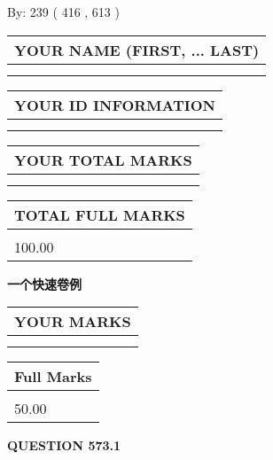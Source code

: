 \documentclass{ctexart}
\begin{document}
   
\hspace{1.0in} By: 
 239 ( 416 ,  613 )
   
   
   
   
\newpage 
\setcounter{page}{ 
   573001 } 
   
   
   
   
\noindent\begin{tabular}{|l|}
\hline
YOUR NAME (FIRST, ... LAST)  \\
\hline
 \\ 
 \\ 
\hline
\end{tabular}
\hspace{0.05in} \begin{tabular}{|l|}
\hline
 YOUR   ID   INFORMATION  \\
\hline
 \\ 
 \\ 
\hline
\end{tabular}
   
   
\vspace{0.2in}\noindent\begin{tabular}{|l|}
\hline
YOUR TOTAL MARKS  \\
\hline
 \\ 
 \\ 
\hline
\end{tabular}
\hspace{0.05in} \begin{tabular}{|l|}
\hline
TOTAL FULL MARKS  \\
\hline
 \\ 
100.00 \\
\hline
\end{tabular}
   
   
 \vspace{0.2in}
{\LARGE {\textbf{ 一个快速卷例}}}
   
   
  
\vspace{0.2in}
  
\noindent\begin{tabular}{|l|}
\hline
 YOUR MARKS  \\
\hline
 \\ 
 \\ 
\hline
\end{tabular}
\hspace{0.05in} \begin{tabular}{|l|}
\hline
 Full Marks  \\
\hline
 \\ 
50.00 \\
\hline
\end{tabular}
{\textbf{\Large{QUESTION
573.1 
}}}
  
\end{document}
